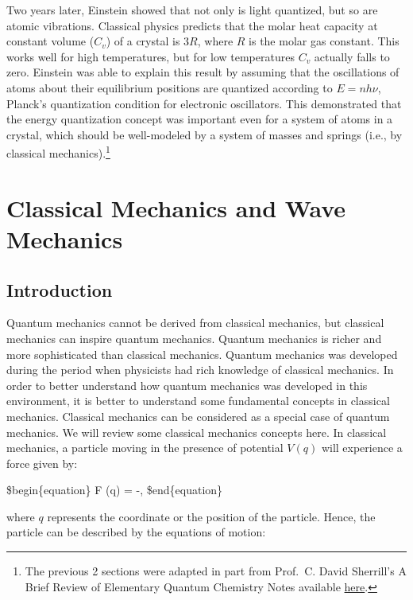 \documentclass[
  9pt,
]{extbook}
\begin{document}
Two years later, Einstein showed that not only is light quantized, but so are atomic vibrations. Classical physics predicts that the molar heat capacity at constant volume (\(C_v\)) of a crystal is \(3 R\), where \(R\) is the molar gas constant. This works well for high temperatures, but for low temperatures \(C_v\) actually falls to zero. Einstein was able to explain this result by assuming that the oscillations of atoms about their equilibrium positions are quantized according to \(E = n h \nu\), Planck's quantization condition for electronic oscillators. This demonstrated that the energy quantization concept was important even for a system of atoms in a crystal, which should be well-modeled by a system of masses and springs (i.e., by classical mechanics).\footnote{The previous 2 sections were adapted in part from Prof.~C. David Sherrill's A Brief Review of Elementary Quantum Chemistry Notes available \href{A\%20Brief\%20Review\%20of\%20Elementary\%20Quantum\%20Chemistry}{here}.}

\hypertarget{Classical}{%
\chapter{Classical Mechanics and Wave Mechanics}\label{Classical}}

\hypertarget{introduction}{%
\section{Introduction}\label{introduction}}

Quantum mechanics cannot be derived from classical mechanics, but classical mechanics can inspire quantum mechanics. Quantum mechanics is richer and more sophisticated than classical mechanics. Quantum mechanics was developed during the period when physicists had rich knowledge of classical mechanics. In order to better understand how quantum mechanics was developed in this environment, it is better to understand some fundamental concepts in classical mechanics. Classical mechanics can be considered as a special case of quantum mechanics. We will review some classical mechanics concepts here.
In classical mechanics, a particle moving in the presence of potential \(V(q)\) will experience a force given by:

\$begin\{equation\}
F (q) = -,
\label{eq:class1}
\$end\{equation\}

where \(q\) represents the coordinate or the position of the particle. Hence, the particle can be described by the equations of motion:
\end{document}
